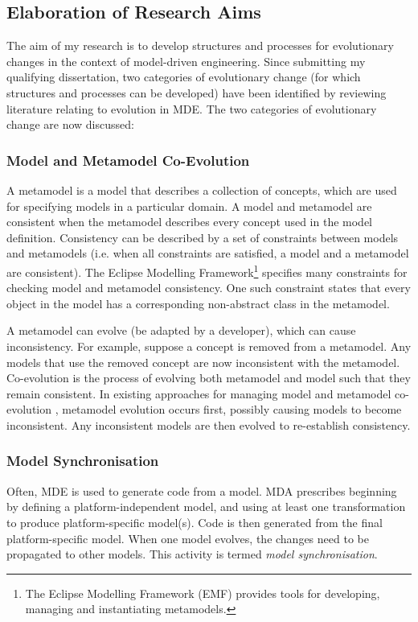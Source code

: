 \subsection{Elaboration of Research Aims}
The aim of my research is to develop structures and processes for evolutionary changes in the context of model-driven engineering. Since submitting my qualifying dissertation, two categories of evolutionary change (for which structures and processes can be developed) have been identified by reviewing literature relating to evolution in MDE. The two categories of evolutionary change are now discussed:

\subsubsection{Model and Metamodel Co-Evolution} %
\label{ssub:model_and_metamodel_co_evolution}
A metamodel is a model that describes a collection of concepts, which are used for specifying models in a particular domain. A model and metamodel are consistent when the metamodel describes every concept used in the model definition. Consistency can be described by a set of constraints between models and metamodels (i.e. when all constraints are satisfied, a model and a metamodel are consistent). The Eclipse Modelling Framework\footnote{The Eclipse Modelling Framework (EMF) \cite{emf} provides tools for developing, managing and instantiating metamodels.} specifies many constraints for checking model and metamodel consistency. One such constraint states that every object in the model has a corresponding non-abstract class in the metamodel.

A metamodel can evolve (be adapted by a developer), which can cause inconsistency. For example, suppose a concept is removed from a metamodel. Any models that use the removed concept are now inconsistent with the metamodel. Co-evolution is the process of evolving both metamodel and model such that they remain consistent. In existing approaches for managing model and metamodel co-evolution \cite{herrmannsdoerfer08cope,cicchetti08automating}, metamodel evolution occurs first, possibly causing models to become inconsistent. Any inconsistent models are then evolved to re-establish consistency.


\subsubsection{Model Synchronisation} %
\label{ssub:model_synchronisation}
Often, MDE is used to generate code from a model. MDA prescribes beginning by defining a platform-independent model, and using at least one transformation to produce platform-specific model(s). Code is then generated from the final platform-specific model. When one model evolves, the changes need to be propagated to other models. This activity is termed \textit{model synchronisation}.

